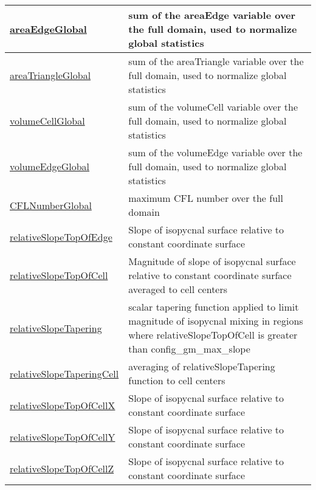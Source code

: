 {\begin{center}
\begin{longtable}{| p{2.0in} | p{4.0in} |}
	\hline
	\hyperref[subsec:var_sec_diagnostics_areaEdgeGlobal]{areaEdgeGlobal} & sum of the areaEdge variable over the full domain, used to normalize global statistics \\
	\hline
	\hyperref[subsec:var_sec_diagnostics_areaTriangleGlobal]{areaTriangleGlobal} & sum of the areaTriangle variable over the full domain, used to normalize global statistics \\
	\hline
	\hyperref[subsec:var_sec_diagnostics_volumeCellGlobal]{volumeCellGlobal} & sum of the volumeCell variable over the full domain, used to normalize global statistics \\
	\hline
	\hyperref[subsec:var_sec_diagnostics_volumeEdgeGlobal]{volumeEdgeGlobal} & sum of the volumeEdge variable over the full domain, used to normalize global statistics \\
	\hline
	\hyperref[subsec:var_sec_diagnostics_CFLNumberGlobal]{CFLNumberGlobal} & maximum CFL number over the full domain \\
	\hline
	\hyperref[subsec:var_sec_diagnostics_relativeSlopeTopOfEdge]{relativeSlopeTopOfEdge} & Slope of isopycnal surface relative to constant coordinate surface \\
	\hline
	\hyperref[subsec:var_sec_diagnostics_relativeSlopeTopOfCell]{relativeSlopeTopOfCell} & Magnitude of slope of isopycnal surface relative to constant coordinate surface averaged to cell centers \\
	\hline
	\hyperref[subsec:var_sec_diagnostics_relativeSlopeTapering]{relativeSlopeTapering} & scalar tapering function applied to limit magnitude of isopycnal mixing in regions where relativeSlopeTopOfCell is greater than config\_gm\_max\_slope \\
	\hline
	\hyperref[subsec:var_sec_diagnostics_relativeSlopeTaperingCell]{relativeSlopeTaperingCell} & averaging of relativeSlopeTapering function to cell centers \\
	\hline
	\hyperref[subsec:var_sec_diagnostics_relativeSlopeTopOfCellX]{relativeSlopeTopOfCellX} & Slope of isopycnal surface relative to constant coordinate surface \\
	\hline
	\hyperref[subsec:var_sec_diagnostics_relativeSlopeTopOfCellY]{relativeSlopeTopOfCellY} & Slope of isopycnal surface relative to constant coordinate surface \\
	\hline
	\hyperref[subsec:var_sec_diagnostics_relativeSlopeTopOfCellZ]{relativeSlopeTopOfCellZ} & Slope of isopycnal surface relative to constant coordinate surface \\
	\hline

\end{longtable}
\end{center}}
